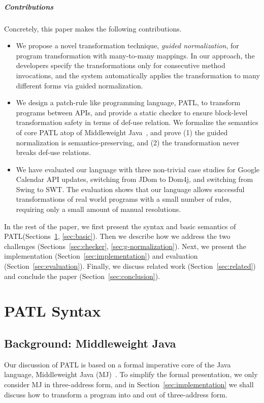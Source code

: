 \documentclass[a4paper, USenglish]{lipics-v2016}
\newcommand{\PATL}{PATL\xspace}
\theoremstyle{plain}
\begin{document}
\subparagraph*{Contributions} Concretely, this paper makes the following contributions.
\begin{itemize}\itemsep-1pt
\item We propose a novel transformation technique, \emph{guided normalization}, for
  program transformation with many-to-many mappings. In our approach,
  the developers specify the transformations only for consecutive
  method invocations, and the system automatically applies the
  transformation to many different forms via guided normalization.
\item We design a patch-rule like programming language, \PATL, to
  transform programs between APIs, and provide a static checker to
  ensure block-level transformation safety in terms of def-use
  relation. We formalize the semantics of core \PATL atop of Middleweight
  Java~\cite{UCAM-CL-TR-563}, and prove (1) the guided normalization is semantics-preserving, and (2)
  the transformation never breaks def-use relations.
\item We have evaluated our language with three non-trivial case studies for Google Calendar API updates,
  switching from JDom to Dom4j, and switching from Swing to SWT.
  The evaluation shows that our language allows successful
  transformations of real world programs with a small number of rules,
  requiring only a small amount of manual resolutions.
\end{itemize}

In the rest of the paper, we first present the syntax and basic
semantics of \PATL (Sections~\ref{sec:syntax}, \ref{sec:basic}). Then we describe 
how we address the two challenges (Sections~\ref{sec:checker}, \ref{sec:g-normalization}).
Next, we present the implementation
(Section~\ref{sec:implementation}) and evaluation
(Section~\ref{sec:evaluation}). Finally, we discuss related work
(Section~\ref{sec:related}) and conclude the paper (Section~\ref{sec:conclusion}).


\section{\PATL Syntax}
\label{sec:syntax}

\subsection{Background: Middleweight Java}
Our discussion of \PATL is based on a formal imperative core
of the Java language, Middleweight Java (MJ)~\cite{UCAM-CL-TR-563}.
To simplify the formal presentation, we only consider MJ in three-address form, and in Section~\ref{sec:implementation} we
shall discuss how to transform a program into and out of three-address form.
\end{document}
